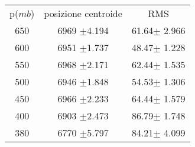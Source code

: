 \begin{center}
\begin{tabulary}{\textwidth}{CCC}
\toprule
p($mb$) &  posizione centroide & RMS \\
650 &6969 $\pm$4.194 &61.64$\pm$ 2.966\\
600 &6951 $\pm$1.737 &48.47$\pm$ 1.228\\
550 &6968 $\pm$2.171 &62.44$\pm$ 1.535\\
500 &6946 $\pm$1.848 &54.53$\pm$ 1.306\\
450 &6966 $\pm$2.233 &64.44$\pm$ 1.579\\
400 &6903 $\pm$2.473 &86.79$\pm$ 1.748\\
380 &6770 $\pm$5.797 &84.21$\pm$ 4.099\\
\bottomrule
\end{tabulary}
\end{center}
